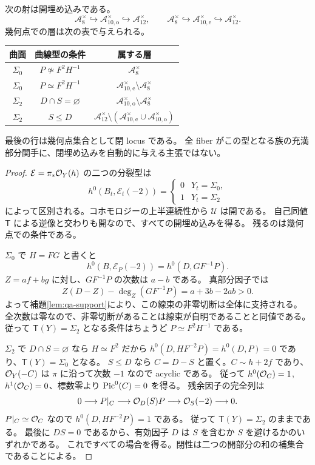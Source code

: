 \begin{theorem}
\label{thm:qa-open-charts}
次の射は開埋め込みである。
\[
 \mathcal A_8^{\times}\hookrightarrow
 \mathcal A_{10,\mathrm o}^{\times}\hookrightarrow\mathcal A_{12}^{\times},
 \qquad
 \mathcal A_8^{\times}\hookrightarrow
 \mathcal A_{10,\mathrm e}^{\times}\hookrightarrow\mathcal A_{12}^{\times}.
\]
幾何点での層は次の表で与えられる。
\begin{center}
\begin{tabular}{c|c|c}
曲面&曲線型の条件&属する層\\\hline
$\Sigma _0$&$P\not\simeq F^2H^{-1}$&$\mathcal A_8^{\times}$\\
$\Sigma _0$&$P\simeq F^2H^{-1}$&$\mathcal A_{10,\mathrm e}^{\times}\setminus\mathcal A_8^{\times}$\\
$\Sigma _2$&$D\cap S=\varnothing$&$\mathcal A_{10,\mathrm o}^{\times}\setminus\mathcal A_8^{\times}$\\
$\Sigma _2$&$S\leq D$&$\mathcal A_{12}^{\times}\setminus
(\mathcal A_{10,\mathrm e}^{\times}\cup\mathcal A_{10,\mathrm o}^{\times})$
\end{tabular}
\end{center}
最後の行は幾何点集合として閉 locus である。
全 fiber がこの型となる族の充満部分関手に、閉埋め込みを自動的に与える主張ではない。
\end{theorem}

\begin{proof}
$\mathcal E=\pi_*\mathcal O_Y(h)$ の二つの分裂型は
\[
 h^0(B_t,\mathcal E_t(-2))=
 \begin{cases}0&Y_t=\Sigma _0,\\1&Y_t=\Sigma _2\end{cases}
\]
によって区別される。コホモロジーの上半連続性から $\mathcal U$ は開である。
自己同値 $\mathsf T$ による逆像と交わりも開なので、すべての開埋め込みを得る。
残るのは幾何点での条件である。

$\Sigma _0$ で $H=FG$ と書くと
\[
 h^0(B,\mathcal E_P(-2))=h^0(D,GF^{-1}P).
\]
$Z=af+bg$ に対し、$GF^{-1}P$ の次数は $a-b$ である。
真部分因子では
\[
 Z(D-Z)-\deg_Z(GF^{-1}P)=a+3b-2ab>0.
\]
よって補題\ref{lem:qa-support}により、この線束の非零切断は全体に支持される。
全次数は零なので、非零切断があることは線束が自明であることと同値である。
従って $\mathsf T(Y)=\Sigma _2$ となる条件はちょうど $P\simeq F^2H^{-1}$ である。

$\Sigma _2$ で $D\cap S=\varnothing$ なら $H\simeq F^2$ だから
$h^0(D,HF^{-2}P)=h^0(D,P)=0$ であり、$\mathsf T(Y)=\Sigma _0$ となる。
$S\leq D$ なら $C=D-S$ と置く。$C\sim h+2f$ であり、
$\mathcal O_Y(-C)$ は $\pi$ に沿って次数 $-1$ なので acyclic である。
従って $h^0(\mathcal O_C)=1$, $h^1(\mathcal O_C)=0$、標数零より $\operatorname{Pic}^0(C)=0$ を得る。
残余因子の完全列は
\[
 0\longrightarrow P|_C\longrightarrow\mathcal O_D(S)P
 \longrightarrow\mathcal O_S(-2)\longrightarrow0.
\]
$P|_C\simeq\mathcal O_C$ なので $h^0(D,HF^{-2}P)=1$ である。
従って $\mathsf T(Y)=\Sigma _2$ のままである。
最後に $D S=0$ であるから、有効因子 $D$ は $S$ を含むか $S$ を避けるかのいずれかである。
これですべての場合を得る。閉性は二つの開部分の和の補集合であることによる。
\end{proof}

